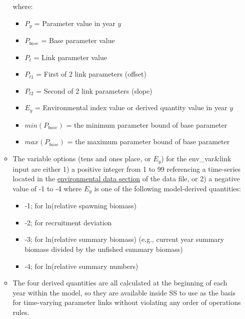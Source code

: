 \begin{itemize}
\begin{itemize}
\begin{itemize}
	   \end{itemize}
		where:
	   \begin{itemize}
	       \item $P_{y}$ = Parameter value in year $y$
           \item $P_{base}$ = Base parameter value
           \item $P_{t}$ = Link parameter value
           \item $P_{t1}$ = First of 2 link parameters (offset)
           \item $P_{t2}$ = Second of 2 link parameters (slope)
           \item $E_{y}$ = Environmental index value or derived quantity value in year $y$
           \item $min(P_{base})$ = the minimum parameter bound of base parameter
           \item $max(P_{base})$ = the maximum parameter bound of base parameter
        \end{itemize}
		\item The variable options (tens and ones place, or $E_{y}$) for the env\_var\&link input are either 1) a positive integer from 1 to 99 referencing a time-series located in the \hyperlink{env-dat}{environmental data section} of the data file, or 2) a negative value of -1 to -4 where $E_y$ is one of the following model-derived quantities:
		\begin{itemize}
			\item -1;  for ln(relative spawning biomass)
			\item -2;  for recruitment deviation
			\item -3;  for ln(relative summary biomass) (e.g., current year summary biomass divided by the unfished summary biomass)
			\item -4;  for ln(relative summary numbers)
		\end{itemize}
		\item The four derived quantities are all calculated at the beginning of each year within the model, so they are available inside SS to use as the basis for time-varying parameter links without violating any order of operations rules.
	\end{itemize}
	

\end{itemize}
